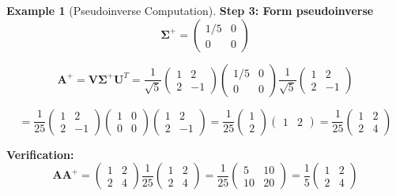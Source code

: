 \documentclass[12pt]{article}
\numberwithin{equation}{section}
\newcommand{\mat}[1]{\mathbf{#1}}        %
\theoremstyle{plain}
\theoremstyle{definition}
\newtheorem{example}[theorem]{Example}
\theoremstyle{remark}
\begin{document}
\begin{example}[Pseudoinverse Computation]
\textbf{Step 3: Form pseudoinverse}
$$\mat{\Sigma}^+ = \begin{pmatrix} 1/5 & 0 \\ 0 & 0 \end{pmatrix}$$

$$\mat{A}^+ = \mat{V}\mat{\Sigma}^+\mat{U}^T = \frac{1}{\sqrt{5}}\begin{pmatrix} 1 & 2 \\ 2 & -1 \end{pmatrix}\begin{pmatrix} 1/5 & 0 \\ 0 & 0 \end{pmatrix}\frac{1}{\sqrt{5}}\begin{pmatrix} 1 & 2 \\ 2 & -1 \end{pmatrix}$$

$$= \frac{1}{25}\begin{pmatrix} 1 & 2 \\ 2 & -1 \end{pmatrix}\begin{pmatrix} 1 & 0 \\ 0 & 0 \end{pmatrix}\begin{pmatrix} 1 & 2 \\ 2 & -1 \end{pmatrix} = \frac{1}{25}\begin{pmatrix} 1 \\ 2 \end{pmatrix}\begin{pmatrix} 1 & 2 \end{pmatrix} = \frac{1}{25}\begin{pmatrix} 1 & 2 \\ 2 & 4 \end{pmatrix}$$

\textbf{Verification:}
$$\mat{A}\mat{A}^+ = \begin{pmatrix} 1 & 2 \\ 2 & 4 \end{pmatrix}\frac{1}{25}\begin{pmatrix} 1 & 2 \\ 2 & 4 \end{pmatrix} = \frac{1}{25}\begin{pmatrix} 5 & 10 \\ 10 & 20 \end{pmatrix} = \frac{1}{5}\begin{pmatrix} 1 & 2 \\ 2 & 4 \end{pmatrix}$$


\end{example}
\end{document}

